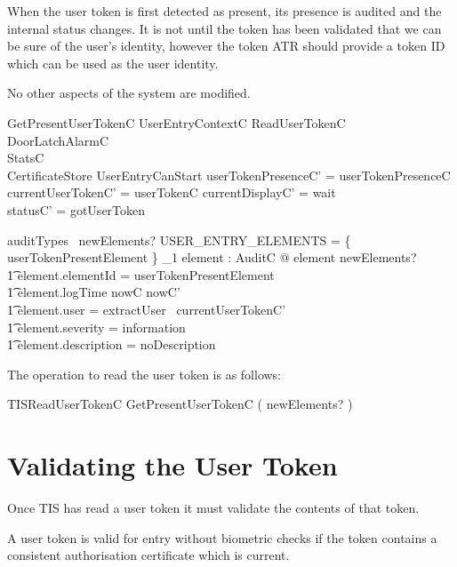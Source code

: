 When the user token is first detected as present, its presence is
audited and the internal status changes. It is not until the token has 
been validated that we can be sure of the user's identity, however the
token ATR should provide a token ID which can be used as the user identity.

No other aspects of the system are modified.

\begin{schema}{GetPresentUserTokenC}
        UserEntryContextC
\also
        ReadUserTokenC
\\	\Xi DoorLatchAlarmC
\\      \Xi StatsC
\\      \Xi CertificateStore
\where
        UserEntryCanStart
\also
        userTokenPresenceC' = userTokenPresenceC
\\      currentUserTokenC' = userTokenC
\also
	currentDisplayC' = wait
\\	statusC' = gotUserToken

\also
        auditTypes~ newElements? \cap USER\_ENTRY\_ELEMENTS = 
        \{ userTokenPresentElement \} 
\also
        \exists_1 element : AuditC @ element \in newElements? 
\\ \t1  \land element.elementId = userTokenPresentElement
\\ \t1  \land element.logTime \in nowC \upto nowC'
\\ \t1  \land element.user = extractUser~ currentUserTokenC'
\\ \t1  \land element.severity = information
\\ \t1  \land element.description = noDescription

\end{schema}

The operation to read the user token is as follows:

\begin{zed}
        TISReadUserTokenC  GetPresentUserTokenC \hide ( newElements? )
\end{zed}


\section{Validating the User Token}
Once TIS has read a user token it must validate the contents of that
token.

A user token is valid for entry without biometric checks if the token
contains a consistent authorisation certificate which is current.

